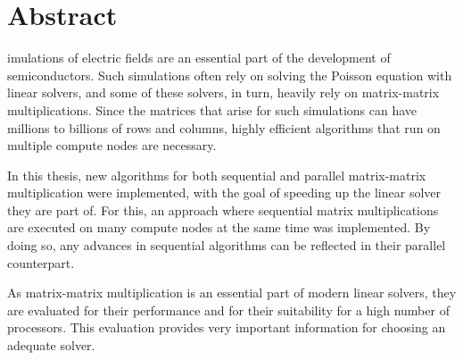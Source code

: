 %
%
%

\chapter*{Abstract}

imulations of electric fields are an essential part of the development of semiconductors. Such simulations often rely on solving the Poisson equation with linear solvers, and some of these solvers, in turn, heavily rely on matrix-matrix multiplications. Since the matrices that arise for such simulations can have millions to billions of rows and columns, highly efficient algorithms that run on multiple compute nodes are necessary. 

In this thesis, new algorithms for both sequential and parallel matrix-matrix multiplication were implemented, with the goal of speeding up the linear solver they are part of. For this, an approach where sequential matrix multiplications are executed on many compute nodes at the same time was implemented. By doing so, any advances in sequential algorithms can be reflected in their parallel counterpart.

As matrix-matrix multiplication is an essential part of modern linear solvers, they are evaluated for their performance and for their suitability for a high number of processors. This evaluation provides very important information for choosing an adequate solver.
\clearpage